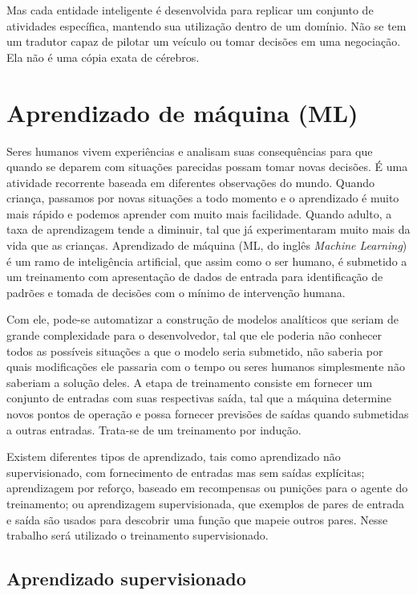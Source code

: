 \documentclass[
	12pt,				%
	oneside,			%
	a4paper,			%
	english,			%
	brazil				%
	]{abntex2}
\begin{document}
	Mas cada entidade inteligente é desenvolvida para replicar um conjunto de atividades específica, mantendo sua utilização dentro de um domínio. Não se tem um tradutor capaz de pilotar um veículo ou tomar decisões em uma negociação. Ela não é uma cópia exata de cérebros. 
		
	\section{Aprendizado de máquina (ML)}
		
	Seres humanos vivem experiências e analisam suas consequências para que quando se deparem com situações parecidas possam tomar novas decisões. É uma atividade recorrente baseada em diferentes observações do mundo. Quando criança, passamos por novas situações a todo momento e o aprendizado é muito mais rápido e podemos aprender com muito mais facilidade. Quando adulto, a taxa de aprendizagem tende a diminuir, tal que já experimentaram muito mais da vida que as crianças.
	Aprendizado de máquina (ML, do inglês \textit{Machine Learning}) é um ramo de inteligência artificial, que assim como o ser humano, é submetido a um treinamento com apresentação de dados de entrada para identificação de padrões e tomada de decisões com o mínimo de intervenção humana. 
	
	Com ele, pode-se automatizar a construção de modelos analíticos que seriam de grande complexidade para o desenvolvedor, tal que ele poderia não conhecer todos as possíveis situações a que o modelo seria submetido, não saberia por quais modificações ele passaria com o tempo ou seres humanos simplesmente não saberiam a solução deles. A etapa de treinamento consiste em fornecer um conjunto de entradas com suas respectivas saída, tal que a máquina determine novos pontos de operação e possa fornecer previsões de saídas quando submetidas a outras entradas. Trata-se de um treinamento por indução. 
	
	Existem diferentes tipos de aprendizado, tais como aprendizado não supervisionado, com fornecimento de entradas mas sem saídas explícitas; aprendizagem por reforço, baseado em recompensas ou punições para o agente do treinamento; ou aprendizagem supervisionada, que exemplos de pares de entrada e saída são usados para descobrir uma função que mapeie outros pares. Nesse trabalho será utilizado o treinamento supervisionado. 
	
	
		\subsection{Aprendizado supervisionado}
		
\end{document}
